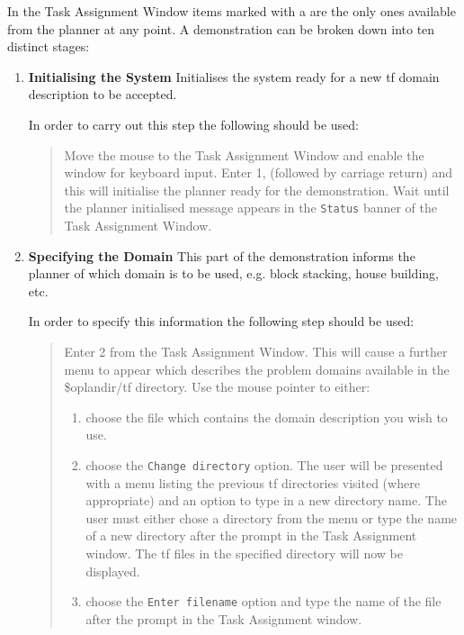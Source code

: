 In the Task Assignment Window items marked with a {\tt *} are the only
ones available from the planner at any point. A demonstration can be
broken down into ten distinct stages:

\begin{enumerate}
\item {\bf Initialising the System} \newline
Initialises the system ready for a new {\sc tf} domain description to be
accepted.

In order to carry out this step the following should be used:

\begin{quote} 
Move the mouse to the Task Assignment Window and enable the window for
keyboard input. Enter 1, (followed by carriage return) and this will
initialise the planner ready for the demonstration. Wait until the
planner initialised message appears in the {\tt Status} banner of the
Task Assignment Window.  
\end{quote}

\item {\bf Specifying the Domain} \newline
This part of the demonstration informs the planner of which domain is
to be used, e.g.  block stacking, house building, etc. 

In order to specify this information the following step should be
used:

\begin{quote}

Enter 2 from the Task Assignment Window. This will cause a further menu 
to appear which describes the problem domains available in the {\sc
\$oplandir}/{\sc tf} directory. Use the mouse pointer to either:

\begin{enumerate}
\item choose the file which contains the domain description you wish
to use.  
\item choose the {\tt Change directory} option. The user will be
presented with a menu listing the previous {\sc tf} directories
visited (where appropriate) and an option to type in a new directory
name. The user must either chose a directory from the menu or type the
name of a new directory after the prompt in the Task Assignment window.
The {\sc tf} files in the specified directory will now be displayed.
\item choose the {\tt Enter filename} option and type the name
of the file after the prompt in the Task Assignment window.
\end{enumerate}


\end{quote}
\end{enumerate}
